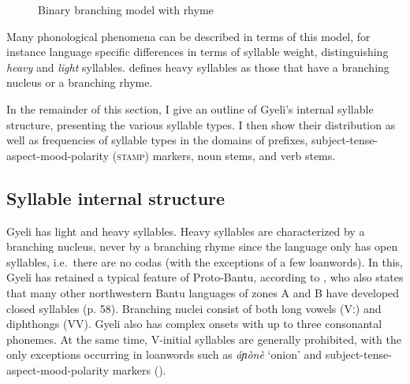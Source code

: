 \begin{figure}
\caption{Binary branching model with rhyme\label{Fig:BranchModel}}
\end{figure}

Many phonological phenomena can be described in terms of this model, for instance language specific differences in terms of syllable weight, distinguishing {\itshape heavy} and {\itshape light} syllables. \citet{hyman85} defines heavy syllables as those that have a branching nucleus or a branching rhyme.

In the remainder of this section, I give an outline of Gyeli's internal syllable structure, presenting the various syllable types. I then show their distribution as well as frequencies of syllable types in the domains of prefixes, subject-tense-aspect-mood-polarity (\textsc{stamp}) markers, noun stems, and verb stems.


\subsection{Syllable internal structure}
\label{sec:SyllIntStr}

Gyeli has light and heavy syllables. Heavy syllables are characterized by a branching nucleus, never by a branching rhyme since the language only has open syllables, i.e.\ there are no codas (with the exceptions of a few loanwords). In this, Gyeli has retained a typical feature of Proto-Bantu, according to \citet[43]{hyman2003}, who also states that many other northwestern Bantu languages of zones A and B have developed closed syllables (p. 58).
Branching nuclei consist of both long vowels (Vː) and diphthongs (VV). Gyeli also has complex onsets with up to three consonantal phonemes. At the same time, V-initial syllables are generally prohibited, with the only exceptions occurring in loanwords such as {\itshape áɲònè} `onion' and subject-tense-aspect-mood-polarity markers ().

